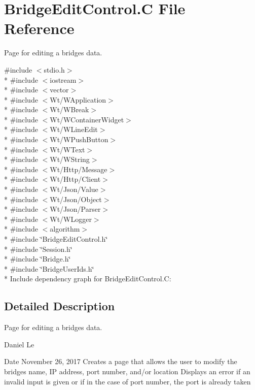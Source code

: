 \hypertarget{BridgeEditControl_8C}{}\section{Bridge\+Edit\+Control.\+C File Reference}
\label{BridgeEditControl_8C}


Page for editing a bridge\textquotesingle{}s data.  


{\ttfamily \#include $<$stdio.\+h$>$}\\*
{\ttfamily \#include $<$iostream$>$}\\*
{\ttfamily \#include $<$vector$>$}\\*
{\ttfamily \#include $<$Wt/\+W\+Application$>$}\\*
{\ttfamily \#include $<$Wt/\+W\+Break$>$}\\*
{\ttfamily \#include $<$Wt/\+W\+Container\+Widget$>$}\\*
{\ttfamily \#include $<$Wt/\+W\+Line\+Edit$>$}\\*
{\ttfamily \#include $<$Wt/\+W\+Push\+Button$>$}\\*
{\ttfamily \#include $<$Wt/\+W\+Text$>$}\\*
{\ttfamily \#include $<$Wt/\+W\+String$>$}\\*
{\ttfamily \#include $<$Wt/\+Http/\+Message$>$}\\*
{\ttfamily \#include $<$Wt/\+Http/\+Client$>$}\\*
{\ttfamily \#include $<$Wt/\+Json/\+Value$>$}\\*
{\ttfamily \#include $<$Wt/\+Json/\+Object$>$}\\*
{\ttfamily \#include $<$Wt/\+Json/\+Parser$>$}\\*
{\ttfamily \#include $<$Wt/\+W\+Logger$>$}\\*
{\ttfamily \#include $<$algorithm$>$}\\*
{\ttfamily \#include \char`\"{}Bridge\+Edit\+Control.\+h\char`\"{}}\\*
{\ttfamily \#include \char`\"{}Session.\+h\char`\"{}}\\*
{\ttfamily \#include \char`\"{}Bridge.\+h\char`\"{}}\\*
{\ttfamily \#include \char`\"{}Bridge\+User\+Ids.\+h\char`\"{}}\\*
Include dependency graph for Bridge\+Edit\+Control.\+C\+:


\subsection{Detailed Description}
Page for editing a bridge\textquotesingle{}s data. 

Daniel Le \begin{DoxyDate}{Date}
November 26, 2017 Creates a page that allows the user to modify the bridge\textquotesingle{}s name, IP address, port number, and/or location Displays an error if an invalid input is given or if in the case of port number, the port is already taken 
\end{DoxyDate}
